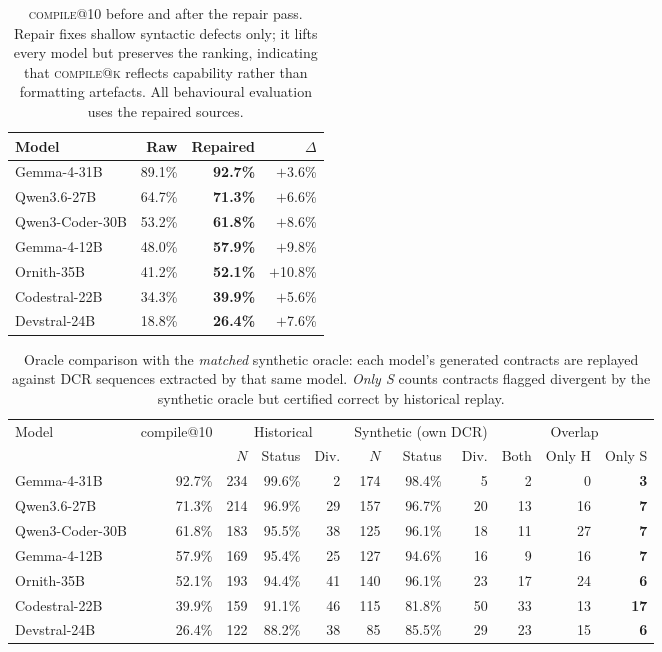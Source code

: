 \begin{table}[t]\centering\small
\caption{\textsc{compile@10} before and after the repair pass. Repair fixes shallow syntactic defects only; it lifts every model but preserves the ranking, indicating that \textsc{compile@k} reflects capability rather than formatting artefacts. All behavioural evaluation uses the repaired sources.}
\label{tab:repair}
\begin{tabular}{l r r r}
\toprule
Model & Raw & Repaired & $\Delta$ \\
\midrule
Gemma-4-31B & 89.1\% & \textbf{92.7\%} & $+$3.6\% \\
Qwen3.6-27B & 64.7\% & \textbf{71.3\%} & $+$6.6\% \\
Qwen3-Coder-30B & 53.2\% & \textbf{61.8\%} & $+$8.6\% \\
Gemma-4-12B & 48.0\% & \textbf{57.9\%} & $+$9.8\% \\
Ornith-35B & 41.2\% & \textbf{52.1\%} & $+$10.8\% \\
Codestral-22B & 34.3\% & \textbf{39.9\%} & $+$5.6\% \\
Devstral-24B & 18.8\% & \textbf{26.4\%} & $+$7.6\% \\
\bottomrule\end{tabular}\end{table}

\begin{table}[t]\centering\small
\caption{Oracle comparison with the \emph{matched} synthetic oracle: each model's generated contracts are replayed against DCR sequences extracted by that same model. \emph{Only S} counts contracts flagged divergent by the synthetic oracle but certified correct by historical replay.}
\label{tab:oracle_matched}
\begin{tabular}{l r r r r r r r r r r}
\toprule
Model & compile@10 & \multicolumn{3}{c}{Historical} & \multicolumn{3}{c}{Synthetic (own DCR)} & \multicolumn{3}{c}{Overlap} \\
\cmidrule(lr){3-5}\cmidrule(lr){6-8}\cmidrule(lr){9-11}
 & & $N$ & Status & Div. & $N$ & Status & Div. & Both & Only H & Only S \\
\midrule
Gemma-4-31B & 92.7\% & 234 & 99.6\% & 2 & 174 & 98.4\% & 5 & 2 & 0 & \textbf{3} \\
Qwen3.6-27B & 71.3\% & 214 & 96.9\% & 29 & 157 & 96.7\% & 20 & 13 & 16 & \textbf{7} \\
Qwen3-Coder-30B & 61.8\% & 183 & 95.5\% & 38 & 125 & 96.1\% & 18 & 11 & 27 & \textbf{7} \\
Gemma-4-12B & 57.9\% & 169 & 95.4\% & 25 & 127 & 94.6\% & 16 & 9 & 16 & \textbf{7} \\
Ornith-35B & 52.1\% & 193 & 94.4\% & 41 & 140 & 96.1\% & 23 & 17 & 24 & \textbf{6} \\
Codestral-22B & 39.9\% & 159 & 91.1\% & 46 & 115 & 81.8\% & 50 & 33 & 13 & \textbf{17} \\
Devstral-24B & 26.4\% & 122 & 88.2\% & 38 & 85 & 85.5\% & 29 & 23 & 15 & \textbf{6} \\
\bottomrule\end{tabular}\end{table}

